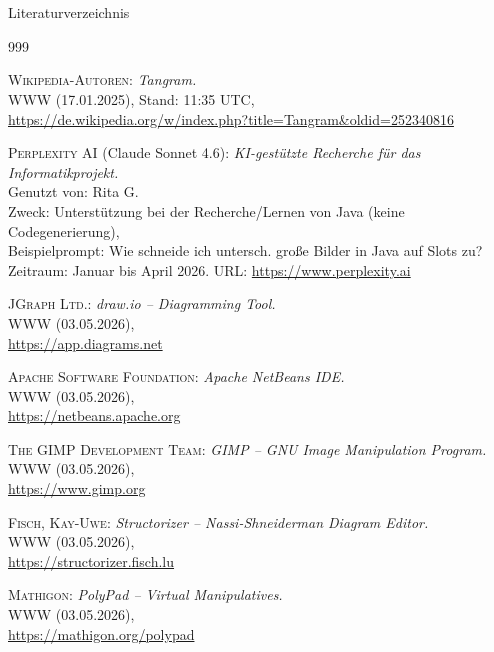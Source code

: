 \documentclass{beamer}
\begin{document}
	
	\section*{}
	\begin{frame}[allowframebreaks]{Literaturverzeichnis}
		
		\begin{thebibliography}{999}
			
			 \textsc{Wikipedia-Autoren}: \textit{Tangram.}\\
			{\small WWW (17.01.2025), Stand: 11:35 UTC,}\\
			\url{https://de.wikipedia.org/w/index.php?title=Tangram&oldid=252340816}
			
			 \textsc{Perplexity AI} (Claude Sonnet 4.6):
			\textit{KI-gestützte Recherche für das Informatikprojekt.}\\
			{\small Genutzt von: Rita G.}\\
			{\small Zweck: Unterstützung bei der Recherche/Lernen von Java (keine Codegenerierung),}\\
			{\small Beispielprompt: Wie schneide ich untersch. große Bilder in Java auf Slots zu?}\\
			{\small Zeitraum: Januar bis April 2026. URL: \url{https://www.perplexity.ai}}
			
			 \textsc{JGraph Ltd.}: \textit{draw.io – Diagramming Tool.}\\
			{\small WWW (03.05.2026),}\\
			\url{https://app.diagrams.net}
			
			 \textsc{Apache Software Foundation}: \textit{Apache NetBeans IDE.}\\
			{\small WWW (03.05.2026),}\\
			\url{https://netbeans.apache.org}
			
			 \textsc{The GIMP Development Team}: \textit{GIMP – GNU Image Manipulation Program.}\\
			{\small WWW (03.05.2026),}\\
			\url{https://www.gimp.org}
			
			 \textsc{Fisch, Kay-Uwe}: \textit{Structorizer – Nassi-Shneiderman Diagram Editor.}\\
			{\small WWW (03.05.2026),}\\
			\url{https://structorizer.fisch.lu}
			
			 \textsc{Mathigon}: \textit{PolyPad – Virtual Manipulatives.}\\
			{\small WWW (03.05.2026),}\\
			\url{https://mathigon.org/polypad}
			
		\end{thebibliography}
	\end{frame}
	
\end{document}
